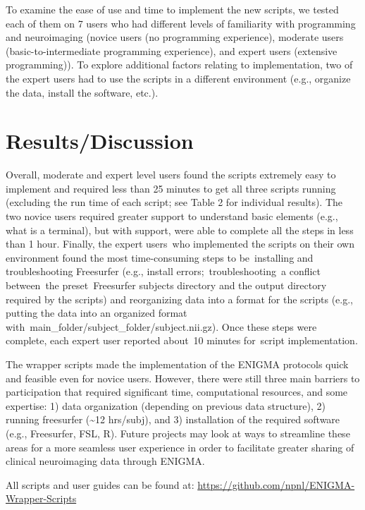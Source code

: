 \documentclass[twocolumn]{bmcart}%
\begin{document}
To examine the ease of use and time to implement the new scripts, we
tested each of them on 7 users who had different levels of familiarity
with programming and neuroimaging (novice users (no programming
experience), moderate users (basic-to-intermediate programming
experience), and expert users (extensive programming)). To explore
additional factors relating to implementation, two of the expert users
had to use the scripts in a different environment (e.g., organize the
data, install the software, etc.).

\section{Results/Discussion}\label{resultsdiscussion}

Overall, moderate and expert level users found the scripts extremely
easy to implement and required less than 25 minutes to get all three
scripts running (excluding the run time of each script; see Table 2 for
individual results). The two novice users required greater support to
understand basic elements (e.g., what is a terminal), but with support,
were able to complete all the steps in less than 1 hour. Finally, the expert users who implemented the scripts on their own environment found the most time-consuming steps to be installing and troubleshooting Freesurfer (e.g., install errors; troubleshooting a conflict between the preset Freesurfer subjects directory and the output directory required by the scripts) and reorganizing data into a format for the scripts (e.g., putting the data into an organized format with main_folder/subject_folder/subject.nii.gz). Once these steps were complete, each expert user reported about 10 minutes for script implementation.

The wrapper scripts made the implementation of the ENIGMA protocols
quick and feasible even for novice users. However, there were still
three main barriers to participation that required significant time,
computational resources, and some expertise: 1) data organization
(depending on previous data structure), 2) running freesurfer
(\textasciitilde{}12 hrs/subj), and 3) installation of the required
software (e.g., Freesurfer, FSL, R). Future projects may look at ways to
streamline these areas for a more seamless user experience in order to
facilitate greater sharing of clinical neuroimaging data through ENIGMA.

All scripts and user guides can be found at:
\url{https://github.com/npnl/ENIGMA-Wrapper-Scripts}
\end{document}
